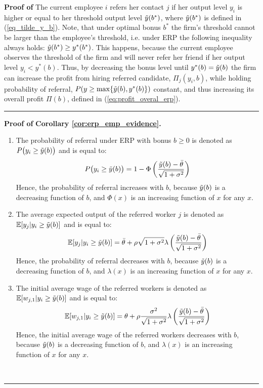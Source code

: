 \documentclass[12pt]{article}
\newenvironment{proof}[1][Proof of]{\noindent\textbf{#1} }{\ \rule{0.5em}{0.5em}}
\begin{document}
\begin{proof}
    The current employee $i$ refers her contact $j$ if her output level $y_i$ is higher or equal to her threshold output level $\Tilde{y}(b^*)$, where $\Tilde{y}(b^*)$ is defined in (\ref{eq_tilde_y_b}). Note, that under optimal bonus $b^*$ the firm's threshold cannot be larger than the employee's threshold, i.e. under ERP the following inequality always holds: $\Tilde{y}(b^*) \geq y^*(b^*)$. This happens, because the current employee observes the threshold of the firm and will never refer her friend if her output level $y_i < y^*(b)$. Thus, by decreasing the bonus level until $y^*(b) = \Tilde{y}(b)$ the firm can increase the profit from hiring referred candidate, $\Pi_j(y_i, b)$, while holding probability of referral, $P(y \geq \max \lbrace \Tilde{y}(b), y^*(b)\rbrace)$ constant, and thus increasing its overall profit $\Pi(b)$, defined in (\ref{eq:profit_overal_erp}).
\end{proof}

\begin{proof}
    \textbf{Corollary \ref{cor:erp_emp_evidence}.}
    \begin{enumerate}[label={\roman*})]
        \item The probability of referral under ERP with bonus $b\geq 0$ is denoted as $P\bigl(y_i \geq \Tilde{y}(b)\bigr)$ and is equal to:
        \begin{equation*}
            P\bigl(y_i \geq \Tilde{y}(b)\bigr) = 1-\Phi\left( \frac{\Tilde{y}(b) - \bar{\theta}}{\sqrt{1+\sigma^2}} \right)
        \end{equation*}
        Hence, the probability of referral increases with $b$, because $\Tilde{y}(b)$ is a decreasing function of $b$, and $\Phi(x)$ is an increasing function of $x$ for any $x$.
        \item The average expected output of the referred worker $j$ is denoted as $\mathbb{E}[y_j | y_i \geq \Tilde{y}(b)]$ and is equal to:
        \begin{equation*}
            \mathbb{E}[y_j | y_i \geq \Tilde{y}(b)] = \bar{\theta} + \rho \sqrt{1+\sigma^2}\lambda\left( \frac{\Tilde{y}(b) - \bar\theta}{\sqrt{1+\sigma^2}} \right) 
        \end{equation*}
        Hence, the probability of referral decreases with $b$, because $\Tilde{y}(b)$ is a decreasing function of $b$, and $\lambda(x)$ is an increasing function of $x$ for any $x$.
        \item The initial average wage of the referred workers is denoted as $\mathbb{E}[w_{j,1} | y_i \geq \Tilde{y}(b)]$ and is equal to:
        \begin{equation*}
            \mathbb{E}[w_{j,1} | y_i \geq \Tilde{y}(b)] = \theta + \rho\frac{\sigma^2}{\sqrt{1+\sigma^2}}\lambda\left( \frac{\Tilde{y}(b) - \bar\theta}{\sqrt{1+\sigma^2}} \right) 
        \end{equation*}
        Hence, the initial average wage of the referred workers decreases with $b$, because $\Tilde{y}(b)$ is a decreasing function of $b$, and $\lambda(x)$ is an increasing function of $x$ for any $x$.
    \end{enumerate}
\end{proof}
\end{document}
